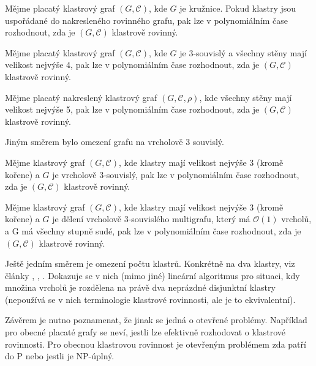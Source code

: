 \begin{theorem}
Mějme placatý klastrový graf  $(G, \mathcal C)$, kde $G$ je kružnice. Pokud klastry jsou uspořádané do nakresleného rovinného grafu, pak lze v polynomiálním čase rozhodnout, zda je  $(G, \mathcal C)$ klastrově rovinný.
\end{theorem}

\begin{theorem}
Mějme placatý klastrový graf  $(G, \mathcal C)$, kde $G$ je 3-souvislý a všechny stěny mají velikost nejvýše 4, pak lze v polynomiálním čase rozhodnout, zda je  $(G, \mathcal C)$ klastrově rovinný.
\end{theorem}

\begin{theorem}
Mějme placatý nakreslený klastrový graf  $(G, \mathcal C, \rho)$, kde všechny stěny mají velikost nejvýše 5, pak lze v polynomiálním čase rozhodnout, zda je  $(G, \mathcal C)$ klastrově rovinný.
\end{theorem}

Jiným směrem bylo omezení grafu na vrcholově 3 souvislý.

\begin{theorem}
Mějme klastrový graf $(G, \mathcal C)$, kde klastry mají velikost nejvýše 3 (kromě kořene) a $G$ je vrcholově 3-souvislý, pak lze v polynomiálním čase rozhodnout, zda je  $(G, \mathcal C)$ klastrově rovinný. 
\end{theorem}

\begin{theorem}
Mějme klastrový graf $(G, \mathcal C)$, kde klastry mají velikost nejvýše 3 (kromě kořene) a $G$ je dělení vrcholově 3-souvislého multigrafu, který má $\mathcal O(1)$ vrcholů, a G má všechny stupně sudé, pak lze v polynomiálním čase rozhodnout, zda je  $(G, \mathcal C)$ klastrově rovinný. 
\end{theorem}

Ještě jedním směrem je omezení počtu klastrů. Konkrétně na dva klastry, viz články \cite{BiedlI98}, \cite{BiedlII98}, \cite{BiedlIII98}. Dokazuje se v nich (mimo jiné) lineární algoritmus pro situaci, kdy množina vrcholů je rozdělena na právě dva neprázdné disjunktní klastry (nepoužívá se v nich terminologie klastrové rovinnosti, ale je to ekvivalentní). 

Závěrem je nutno poznamenat, že jinak se jedná o otevřené problémy. Například pro obecné placaté grafy se neví, jestli lze efektivně rozhodovat o klastrové rovinnosti. Pro obecnou klastrovou rovinnost je otevřeným problémem zda patří do P nebo jestli je NP-úplný.